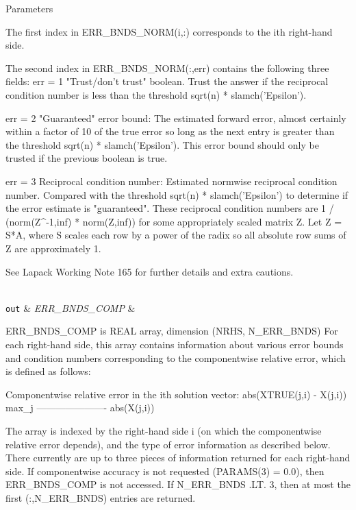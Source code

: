\begin{DoxyParams}[1]{Parameters}
\begin{DoxyVerb}
     The first index in ERR_BNDS_NORM(i,:) corresponds to the ith
     right-hand side.

     The second index in ERR_BNDS_NORM(:,err) contains the following
     three fields:
     err = 1 "Trust/don't trust" boolean. Trust the answer if the
              reciprocal condition number is less than the threshold
              sqrt(n) * slamch('Epsilon').

     err = 2 "Guaranteed" error bound: The estimated forward error,
              almost certainly within a factor of 10 of the true error
              so long as the next entry is greater than the threshold
              sqrt(n) * slamch('Epsilon'). This error bound should only
              be trusted if the previous boolean is true.

     err = 3  Reciprocal condition number: Estimated normwise
              reciprocal condition number.  Compared with the threshold
              sqrt(n) * slamch('Epsilon') to determine if the error
              estimate is "guaranteed". These reciprocal condition
              numbers are 1 / (norm(Z^{-1},inf) * norm(Z,inf)) for some
              appropriately scaled matrix Z.
              Let Z = S*A, where S scales each row by a power of the
              radix so all absolute row sums of Z are approximately 1.

     See Lapack Working Note 165 for further details and extra
     cautions.\end{DoxyVerb}
\\
\hline
\mbox{\tt out}  & {\em E\+R\+R\+\_\+\+B\+N\+D\+S\+\_\+\+C\+O\+M\+P} & \begin{DoxyVerb}          ERR_BNDS_COMP is REAL array, dimension (NRHS, N_ERR_BNDS)
     For each right-hand side, this array contains information about
     various error bounds and condition numbers corresponding to the
     componentwise relative error, which is defined as follows:

     Componentwise relative error in the ith solution vector:
                    abs(XTRUE(j,i) - X(j,i))
             max_j ----------------------
                         abs(X(j,i))

     The array is indexed by the right-hand side i (on which the
     componentwise relative error depends), and the type of error
     information as described below. There currently are up to three
     pieces of information returned for each right-hand side. If
     componentwise accuracy is not requested (PARAMS(3) = 0.0), then
     ERR_BNDS_COMP is not accessed.  If N_ERR_BNDS .LT. 3, then at most
     the first (:,N_ERR_BNDS) entries are returned.


\end{DoxyVerb}
\end{DoxyParams}
